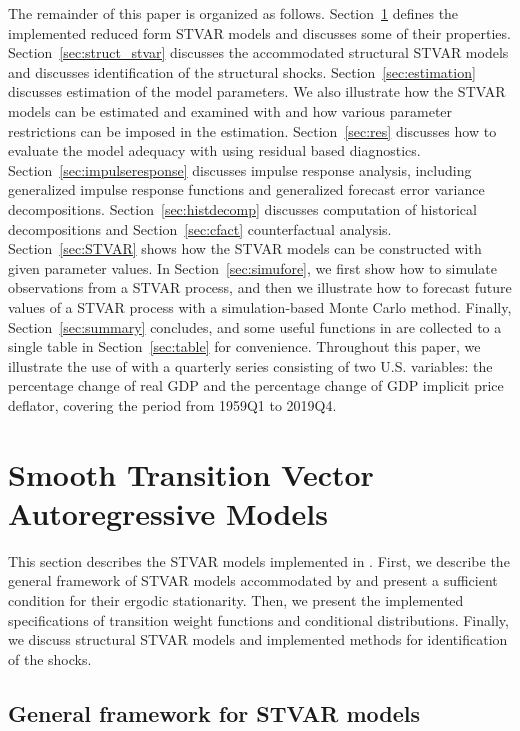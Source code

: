 \documentclass[nojss]{jss}
\begin{document}
The remainder of this paper is organized as follows. Section~\ref{sec:models} defines the implemented reduced form STVAR models and discusses some of their properties. Section~\ref{sec:struct_stvar} discusses the accommodated structural STVAR models and discusses identification of the structural shocks. Section~\ref{sec:estimation} discusses estimation of the model parameters. We also illustrate how the STVAR models can be estimated and examined with  and how various parameter restrictions can be imposed in the estimation. Section~\ref{sec:res} discusses how to evaluate the model adequacy with  using residual based diagnostics. Section~\ref{sec:impulseresponse} discusses impulse response analysis, including generalized impulse response functions and generalized forecast error variance decompositions. Section~\ref{sec:histdecomp} discusses computation of historical decompositions and Section~\ref{sec:cfact} counterfactual analysis. Section~\ref{sec:STVAR} shows how the STVAR models can be constructed with given parameter values. In Section~\ref{sec:simufore}, we first show how to simulate observations from a STVAR process, and then we illustrate how to forecast future values of a STVAR process with a simulation-based Monte Carlo method. Finally, Section~\ref{sec:summary} concludes, and some useful functions in  are collected to a single table in Section~\ref{sec:table} for convenience. Throughout this paper, we illustrate the use of  with a quarterly series consisting of two U.S. variables: the percentage change of real GDP and the percentage change of GDP implicit price deflator, covering the period from 1959Q1 to 2019Q4.


\section{Smooth Transition Vector Autoregressive Models}\label{sec:models}

This section describes the STVAR models implemented in . First, we describe the general framework of STVAR models accommodated by  and present a sufficient condition for their ergodic stationarity. Then, we present the implemented specifications of transition weight functions and conditional distributions. Finally, we discuss structural STVAR models and implemented methods for identification of the shocks.


\subsection{General framework for STVAR models}\label{sec:genstvar}
\end{document}
